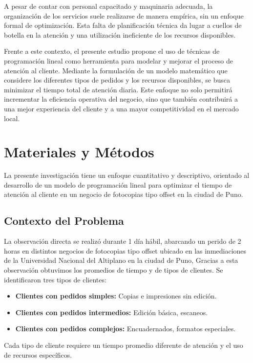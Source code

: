 \documentclass[12pt]{article}
\begin{document}
A pesar de contar con personal capacitado y maquinaria adecuada, la organización de los servicios suele realizarse de manera empírica, sin un enfoque formal de optimización. Esta falta de planificación técnica da lugar a cuellos de botella en la atención y una utilización ineficiente de los recursos disponibles.

Frente a este contexto, el presente estudio propone el uso de técnicas de programación lineal como herramienta para modelar y mejorar el proceso de atención al cliente. Mediante la formulación de un modelo matemático que considere los diferentes tipos de pedidos y los recursos disponibles, se busca minimizar el tiempo total de atención diaria. Este enfoque no solo permitirá incrementar la eficiencia operativa del negocio, sino que también contribuirá a una mejor experiencia del cliente y a una mayor competitividad en el mercado local.


\section{Materiales y Métodos}
La presente investigación tiene un enfoque cuantitativo y descriptivo, orientado al desarrollo de un modelo de programación lineal para optimizar el tiempo de atención al cliente en un negocio de fotocopias tipo offset en la ciudad de Puno.

\subsection{Contexto del Problema}

La observación directa se realizó durante 1 día hábil, abarcando un perido de 2 horas en distintos negocios de fotocopias tipo offset ubicado en las inmediaciones de la Universidad Nacional del Altiplano en la ciudad de Puno, Gracias a esta observación obtuvimos los promedios de tiempo y de tipos de clientes.
Se identificaron tres tipos de clientes:

\begin{itemize}
  \item \textbf{Clientes con pedidos simples:} Copias e impresiones sin edición.
  \item \textbf{Clientes con pedidos intermedios:} Edición básica, escaneos.
  \item \textbf{Clientes con pedidos complejos:} Encuadernados, formatos especiales.
\end{itemize}

Cada tipo de cliente requiere un tiempo promedio diferente de atención y el uso de recursos específicos.
\end{document}
